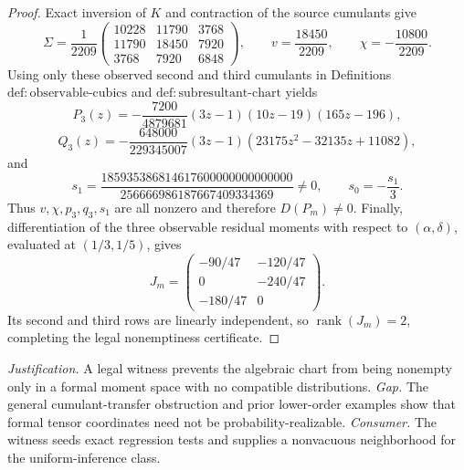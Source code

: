 \documentclass{article}
\begin{document}
\begin{proof}
Exact inversion of \(K\) and contraction of the source cumulants give
\[
\Sigma=\frac1{2209}
\begin{pmatrix}
10228&11790&3768\\
11790&18450&7920\\
3768&7920&6848
\end{pmatrix},
\qquad
v=\frac{18450}{2209},
\qquad
\chi=-\frac{10800}{2209}.
\]
Using only these observed second and third cumulants in Definitions \(\mathrm{def:observable\mbox{-}cubics}\) and \(\mathrm{def:subresultant\mbox{-}chart}\) yields
\[
P_3(z)=-\frac{7200}{4879681}(3z-1)(10z-19)(165z-196),
\]
\[
Q_3(z)=-\frac{648000}{229345007}(3z-1)
       (23175z^2-32135z+11082),
\]
and
\[
s_1=\frac{185935386814617600000000000000}
{256666986187667409334369}\neq0,
\qquad
s_0=-\frac{s_1}{3}.
\]
Thus \(v,\chi,p_3,q_3,s_1\) are all nonzero and therefore \(D(P_m)\neq0\). Finally, differentiation of the three observable residual moments with respect to \((\alpha,\delta)\), evaluated at \((1/3,1/5)\), gives
\[
J_m=
\begin{pmatrix}
-90/47&-120/47\\
0&-240/47\\
-180/47&0
\end{pmatrix}.
\]
Its second and third rows are linearly independent, so \(\operatorname{rank}(J_m)=2\), completing the legal nonemptiness certificate.
\end{proof}
\par\smallskip\noindent \textit{Justification.} A legal witness prevents the algebraic chart from being nonempty only in a formal moment space with no compatible distributions. \textit{Gap.} The general cumulant-transfer obstruction and prior lower-order examples show that formal tensor coordinates need not be probability-realizable. \textit{Consumer.} The witness seeds exact regression tests and supplies a nonvacuous neighborhood for the uniform-inference class.
\end{document}

